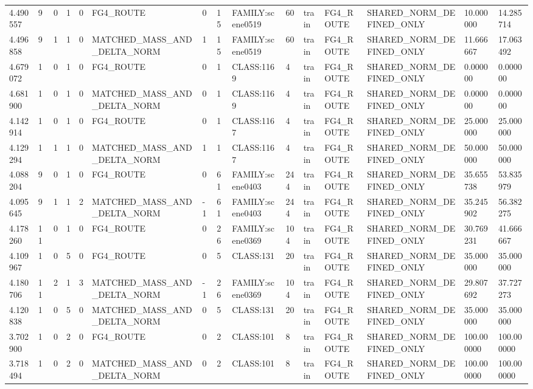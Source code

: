 \begin{tabular}{lllllllllllllll}
4.490557 & 9 & 0 & 1 & 0 & FG4\_ROUTE & 0 & 15 & FAMILY:scene0519 & 60 & train & FG4\_ROUTE & SHARED\_NORM\_DEFINED\_ONLY & 10.000000 & 14.285714 \\
4.496858 & 9 & 1 & 1 & 0 & MATCHED\_MASS\_AND\_DELTA\_NORM & 1 & 15 & FAMILY:scene0519 & 60 & train & FG4\_ROUTE & SHARED\_NORM\_DEFINED\_ONLY & 11.666667 & 17.063492 \\
4.679072 & 1 & 0 & 1 & 0 & FG4\_ROUTE & 0 & 1 & CLASS:1169 & 4 & train & FG4\_ROUTE & SHARED\_NORM\_DEFINED\_ONLY & 0.000000 & 0.000000 \\
4.681900 & 1 & 0 & 1 & 0 & MATCHED\_MASS\_AND\_DELTA\_NORM & 0 & 1 & CLASS:1169 & 4 & train & FG4\_ROUTE & SHARED\_NORM\_DEFINED\_ONLY & 0.000000 & 0.000000 \\
4.142914 & 1 & 0 & 1 & 0 & FG4\_ROUTE & 0 & 1 & CLASS:1167 & 4 & train & FG4\_ROUTE & SHARED\_NORM\_DEFINED\_ONLY & 25.000000 & 25.000000 \\
4.129294 & 1 & 1 & 1 & 0 & MATCHED\_MASS\_AND\_DELTA\_NORM & 1 & 1 & CLASS:1167 & 4 & train & FG4\_ROUTE & SHARED\_NORM\_DEFINED\_ONLY & 50.000000 & 50.000000 \\
4.088204 & 9 & 0 & 1 & 0 & FG4\_ROUTE & 0 & 61 & FAMILY:scene0403 & 244 & train & FG4\_ROUTE & SHARED\_NORM\_DEFINED\_ONLY & 35.655738 & 53.835979 \\
4.095645 & 9 & 1 & 1 & 2 & MATCHED\_MASS\_AND\_DELTA\_NORM & -1 & 61 & FAMILY:scene0403 & 244 & train & FG4\_ROUTE & SHARED\_NORM\_DEFINED\_ONLY & 35.245902 & 56.382275 \\
4.178260 & 11 & 0 & 1 & 0 & FG4\_ROUTE & 0 & 26 & FAMILY:scene0369 & 104 & train & FG4\_ROUTE & SHARED\_NORM\_DEFINED\_ONLY & 30.769231 & 41.666667 \\
4.109967 & 1 & 0 & 5 & 0 & FG4\_ROUTE & 0 & 5 & CLASS:131 & 20 & train & FG4\_ROUTE & SHARED\_NORM\_DEFINED\_ONLY & 35.000000 & 35.000000 \\
4.180706 & 11 & 2 & 1 & 3 & MATCHED\_MASS\_AND\_DELTA\_NORM & -1 & 26 & FAMILY:scene0369 & 104 & train & FG4\_ROUTE & SHARED\_NORM\_DEFINED\_ONLY & 29.807692 & 37.727273 \\
4.120838 & 1 & 0 & 5 & 0 & MATCHED\_MASS\_AND\_DELTA\_NORM & 0 & 5 & CLASS:131 & 20 & train & FG4\_ROUTE & SHARED\_NORM\_DEFINED\_ONLY & 35.000000 & 35.000000 \\
3.702900 & 1 & 0 & 2 & 0 & FG4\_ROUTE & 0 & 2 & CLASS:101 & 8 & train & FG4\_ROUTE & SHARED\_NORM\_DEFINED\_ONLY & 100.000000 & 100.000000 \\
3.718494 & 1 & 0 & 2 & 0 & MATCHED\_MASS\_AND\_DELTA\_NORM & 0 & 2 & CLASS:101 & 8 & train & FG4\_ROUTE & SHARED\_NORM\_DEFINED\_ONLY & 100.000000 & 100.000000 \\

\end{tabular}

